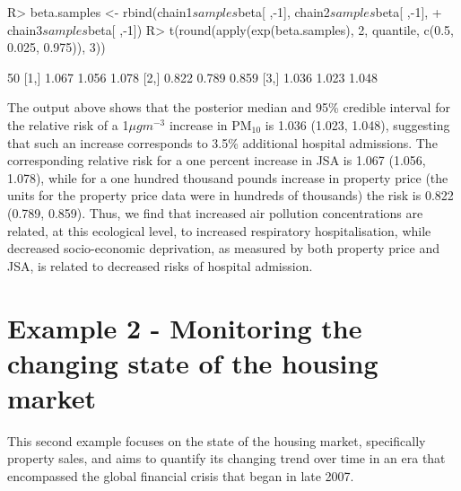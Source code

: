 \documentclass[article, nojss]{jss}
\begin{document}
\begin{CodeInput}
R>  beta.samples <- rbind(chain1$samples$beta[ ,-1], chain2$samples$beta[ ,-1], 
+           chain3$samples$beta[ ,-1])
R>  t(round(apply(exp(beta.samples), 2, quantile, c(0.5, 0.025, 0.975)), 3))
\end{CodeInput}


\begin{CodeOutput}
      50%
[1,] 1.067 1.056 1.078
[2,] 0.822 0.789 0.859
[3,] 1.036 1.023 1.048
\end{CodeOutput}


The output above shows that the posterior median and 95\% credible interval for the relative risk of a 1$\mu gm^{-3}$  increase in PM$_{10}$ is 1.036 (1.023, 1.048), suggesting that such an increase corresponds to 3.5\% additional hospital admissions. The corresponding relative risk for a one percent increase in JSA is 1.067 (1.056, 1.078), while for a one hundred thousand pounds increase in  property price (the units for the  property price data were in hundreds of thousands) the risk is 0.822 (0.789, 0.859). Thus, we find that increased air pollution concentrations are related, at this ecological level, to increased respiratory hospitalisation, while decreased socio-economic deprivation, as measured by both property price and JSA, is related to decreased risks of hospital admission.





\section{Example 2 - Monitoring the changing state of the housing market}\label{section6}
This second example focuses on the state of the housing market, specifically property sales, and aims to quantify its changing trend over time in an era that encompassed the global financial crisis that began in late 2007. 
\end{document}
